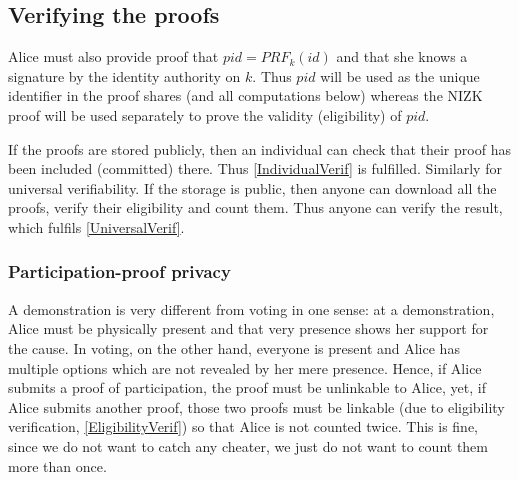 \subsection{Verifying the proofs}

Alice must also provide  proof that \(pid = PRF_k(id)\) and that she 
knows a signature by the identity authority on \(k\).
Thus \(pid\) will be used as the unique identifier in the proof shares (and all 
computations below) whereas the \ac{NIZK} proof will be used separately to prove 
the validity (eligibility) of \(pid\).

If the proofs are stored publicly, then an individual can check that their 
proof has been included (committed) there.
Thus \cref{IndividualVerif} is fulfilled.
Similarly for universal verifiability.
If the storage is public, then anyone can download all the proofs, verify their 
eligibility and count them.
Thus anyone can verify the result, which fulfils \cref{UniversalVerif}.


\subsubsection{Participation-proof privacy}

A demonstration is very different from voting in one sense: at a demonstration, 
Alice must be physically present and that very presence shows her support for 
the cause.
In voting, on the other hand, everyone is present and Alice has multiple 
options which are not revealed by her mere presence.
Hence, if Alice submits a proof of participation, the proof must be unlinkable 
to Alice, yet, if Alice submits another proof, those two proofs must be 
linkable (due to eligibility verification, \cref{EligibilityVerif}) so that 
Alice is not counted twice.
This is fine, since we do not want to catch any cheater, we just do not want to
count them more than once.


